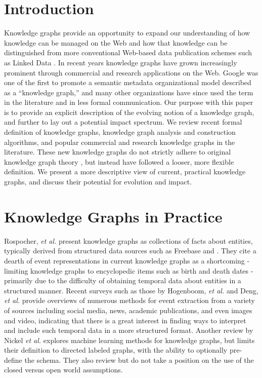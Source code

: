 \documentclass[runningheads,a4paper]{llncs}
\begin{document}
\section{Introduction}


Knowledge graphs provide an opportunity to expand our understanding of how knowledge can be managed on the Web and how that knowledge can be distinguished from more conventional Web-based data publication schemes such as Linked Data \cite{bizer2009linked}.
In recent years knowledge graphs have grown increasingly prominent through commercial and research applications on the Web.
Google was one of the first to promote a semantic metadata organizational model described as a ``knowledge graph,'' \cite{singhal2012introducing} and many other organizations have since used the term in the literature and in less formal communication.
Our purpose with this paper is to provide an explicit description of the evolving notion of a knowledge graph, and further to lay out a potential impact spectrum.  
We review recent formal definition of knowledge graphs, knowledge graph analysis and construction algorithms, and popular commercial and research knowledge graphs in the literature.
These new knowledge graphs do not strictly adhere to original knowledge graph theory \cite{van1992knowledge}, but instead have followed a looser, more flexible definition.
We present a more descriptive view of current, practical knowledge graphs, and discuss their potential for evolution and impact.

\section{Knowledge Graphs in Practice}
Rospocher, \textit{et al.} present knowledge graphs as collections of facts about entities, typically derived from structured data sources such as Freebase and \cite{Rospocher2016}. They cite a dearth of event representations in current knowledge graphs as a shortcoming - limiting knowledge graphs to encyclopedic items such as birth and death dates - primarily due to the difficulty of obtaining temporal data about entities in a structured manner. Recent surveys such as those by Hogenboom, \textit{et al.} \cite{Hogenboom2016} and Deng, \textit{et al.} \cite{Deng2015} provide overviews of numerous methods for event extraction from a variety of sources including social media, news, academic publications, and even images and video, indicating that there is a great interest in finding ways to interpret and include such temporal data in a more structured format.
Another review by Nickel \emph{et al.} explores machine learning methods for knowledge graphs, but limits their definition to directed labeled graphs, with the ability to optionally pre-define the schema.
They also review but do not take a position on the use of the closed versus open world assumptions.
\end{document}
